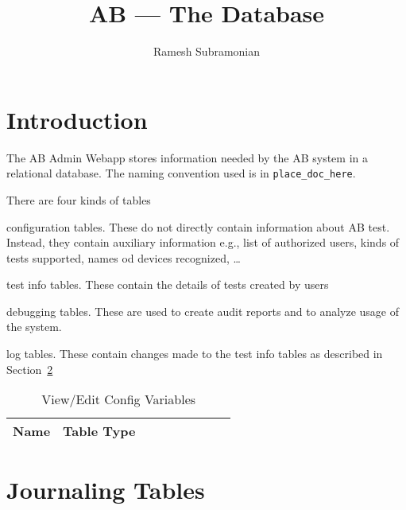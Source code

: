 \documentclass[letterpaper]{article}
\begin{document}
\title{AB --- The Database}
\author{ Ramesh Subramonian }
\maketitle
\thispagestyle{fancy}
\lhead{}
\chead{}
\rhead{}
\cfoot{}
\rfoot{{\small \thepage}}

\section{Introduction}

The AB Admin Webapp stores information needed by the AB system in a relational database.
The naming convention used is in \verb+place_doc_here+.

There are four kinds of tables 
\be
\item configuration tables. These do not directly contain information about AB test.
Instead, they contain auxiliary information e.g., list of authorized users,
kinds of tests supported, names od devices recognized, \ldots
\item test info tables. These contain the details of tests created by users
\item debugging tables. These are used to create audit reports and to
  analyze usage of the system.
\item log tables. These contain changes made to the test info tables as
described in Section~\ref{journaling_tables}
\ee


\begin{table}[hb]
\centering
\begin{tabular}{|l||l|l|l|l|l|l|l|l|}  \hline \hline
  {\bf Name } & {\bf Table Type} \\ \hline \hline

\hline
\end{tabular}
\caption{View/Edit Config Variables}
\label{tbl_config}
\end{table}

\section{Journaling Tables}
\label{journaling_tables}
\end{document}
